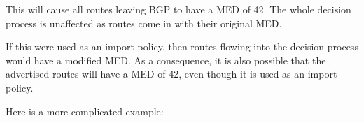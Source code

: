 This will cause all routes leaving BGP to have a MED of 42.  The whole decision
process is unaffected as routes come in with their original MED.  

If this were used as an import policy, then routes flowing into the decision
process would have a modified MED.  As a consequence, it is also possible that
the advertised routes will have a MED of 42, even though it is used as an import
policy.

Here is a more complicated example:

\noindent{}
